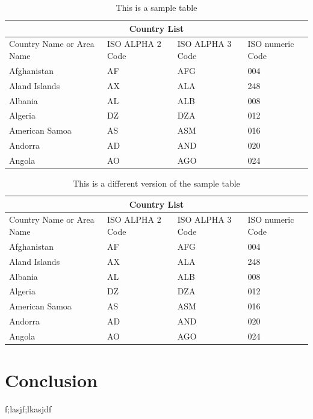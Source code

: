 \documentclass[11pt]{article}
\begin{document}
\begin{table}[H]
\centering
\caption{This is a sample table}\label{tab:1}
\begin{tabular}{ |p{3cm}||p{3cm}|p{3cm}|p{3cm}|  }
 \hline
 \multicolumn{4}{|c|}{Country List} \\
 \hline
 Country Name     or Area Name& ISO ALPHA 2 Code &ISO ALPHA 3 Code&ISO numeric Code\\
 \hline
 Afghanistan   & AF    &AFG&   004\\
 Aland Islands&   AX  & ALA   &248\\
 Albania &AL & ALB&  008\\
 Algeria    &DZ & DZA&  012\\
 American Samoa&   AS  & ASM&016\\
 Andorra& AD  & AND   &020\\
 Angola& AO  & AGO&024\\
 \hline
\end{tabular}
\end{table}

\lipsum[4]

\begin{table}[H]
\centering
\caption{This is a different version of the sample table}\label{tab:2}
\begin{tabular}{@{}llll@{}}
 \toprule
 \multicolumn{4}{c}{Country List} \\
 \midrule
 Country Name     or Area Name& ISO ALPHA 2 Code &ISO ALPHA 3 Code&ISO numeric Code\\
 \hline
 Afghanistan   & AF    &AFG&   004\\
 Aland Islands&   AX  & ALA   &248\\
 Albania &AL & ALB&  008\\
 Algeria    &DZ & DZA&  012\\
 American Samoa&   AS  & ASM&016\\
 Andorra& AD  & AND   &020\\
 Angola& AO  & AGO&024\\
 \bottomrule
\end{tabular}
\end{table}

\lipsum[8]



\section{Conclusion}
\lipsum[9]

f;lasjf;lkasjdf
\end{document}
